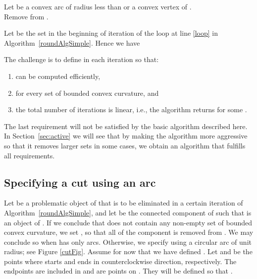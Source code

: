 \documentclass{article}
\begin{document}
\begin{algorithm}[h]
\LinesNumbered
\DontPrintSemicolon
\SetArgSty{}
 {\label{simple:loop}
  Let  be a convex arc of radius less than  or a convex vertex of . \\
  Remove  from . \\
}
\Return {}
\caption{}
\label{roundAlgSimple}
\end{algorithm}

Let  be the set  in the beginning of iteration  of the loop at line \ref{loop} in Algorithm~\ref{roundAlgSimple}.
Hence we have

The challenge is to define  in each iteration so that:
\begin{enumerate}
\item
 can be computed efficiently,
\item
 for every set  of bounded convex curvature, and
\item
the total number of iterations is linear, i.e., the algorithm returns  for some .
\end{enumerate}
The last requirement will not be satisfied by the basic algorithm described here.
In Section~\ref{sec:active} we will see that by making the algorithm more aggressive so that it removes larger sets  in some cases, we obtain an algorithm that fulfills all requirements.

\subsection{Specifying a cut using an arc }\label{sec:specifying}

Let  be a problematic object of  
that is to be eliminated in a certain iteration of Algorithm~\ref{roundAlgSimple}, and let  be the connected component of  such that  is an object of .
If we conclude that  does not contain any non-empty set of
bounded convex curvature, we set , so that all of the component  is removed from
.
We may conclude so when  has only  arcs.
Otherwise, we specify  using a circular arc 
of unit radius; see Figure \ref{cutFig}.
Assume for now that we have defined .
Let  and  be the points where  starts
and ends in counterclockwise direction, respectively.
The endpoints are included in  and
are points on .
They will be defined so that .
\end{document}
